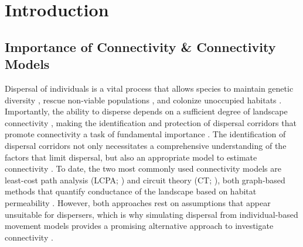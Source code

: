 \documentclass[abstract=on,10pt,a4paper,bibliography=totocnumbered]{article}
\begin{document}
\newpage

\onehalfspacing
\tableofcontents
\doublespacing

\newpage
{}


\section{Introduction}

\subsection{Importance of Connectivity \& Connectivity Models}
Dispersal of individuals is a vital process that allows species to maintain
genetic diversity \citep{Perrin.1999, Perrin.2000, Frankham.2002, Leigh.2012,
Baguette.2013}, rescue non-viable populations \citep{Brown.1977}, and colonize
unoccupied habitats \citep{Hanski.1999b, MacArthur.2001}. Importantly, the
ability to disperse depends on a sufficient degree of landscape connectivity
\citep{Fahrig.2003, Clobert.2012}, making the identification and protection of
dispersal corridors that promote connectivity a task of fundamental importance
\citep{Nathan.2008, Doerr.2011, Rudnick.2012}. The identification of dispersal
corridors not only necessitates a comprehensive understanding of the factors
that limit dispersal, but also an appropriate model to estimate connectivity
\citep{Baguette.2013, Vasudev.2015, Hofmann.2021}. To date, the two most
commonly used connectivity models are least-cost path analysis (LCPA;
\citealp{Adriaensen.2003}) and circuit theory (CT; \citealp{McRae.2006,
McRae.2008}), both graph-based methods that quantify conductance of the
landscape based on habitat permeability \citep{Zeller.2012}. However, both
approaches rest on assumptions that appear unsuitable for dispersers, which is
why simulating dispersal from individual-based movement models provides a
promising alternative approach to investigate connectivity \citep{Diniz.2019}.

\end{document}
